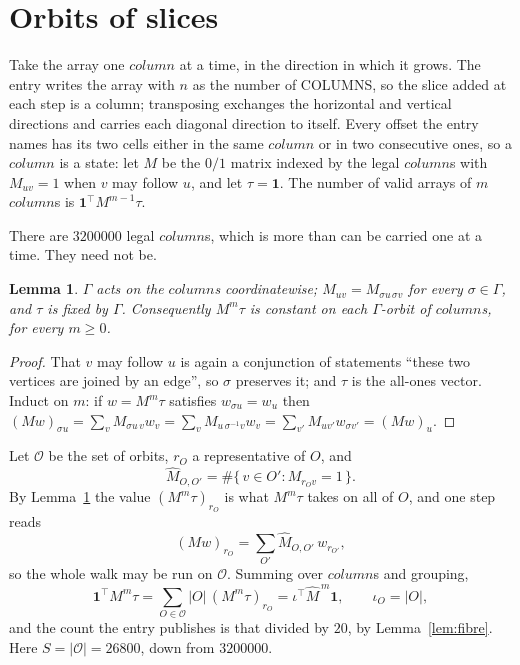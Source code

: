 \documentclass[11pt,a4paper]{article}
\theoremstyle{plain}
\newtheorem{lemma}[theorem]{Lemma}
\theoremstyle{definition}
\begin{document}
\section{Orbits of slices}

Take the array one $column$ at a time, in the direction in which it grows. The entry writes the array with $n$ as the number of COLUMNS, so the slice added at each step is a column; transposing exchanges the horizontal and vertical directions and carries each diagonal direction to itself.
Every offset the entry names has its two cells either in the same $column$ or in two
consecutive ones, so a $column$ is a state: let $M$ be the $0/1$ matrix indexed by the
legal $column$s with $M_{uv}=1$ when $v$ may follow $u$, and let $\tau=\mathbf{1}$.
The number of valid arrays of $m$ $column$s is $\mathbf{1}^{\!\top}M^{m-1}\tau$.

There are $3200000$ legal $column$s, which is more than can be carried one at a time. They
need not be.

\begin{lemma}\label{lem:lump}
$\Gamma$ acts on the $column$s coordinatewise; $M_{uv}=M_{\sigma u\,\sigma v}$ for
every $\sigma\in\Gamma$, and $\tau$ is fixed by $\Gamma$. Consequently $M^{m}\tau$ is constant
on each $\Gamma$-orbit of $column$s, for every $m\ge0$.
\end{lemma}

\begin{proof}
That $v$ may follow $u$ is again a conjunction of statements ``these two vertices are joined by
an edge'', so $\sigma$ preserves it; and $\tau$ is the all-ones vector. Induct on $m$: if
$w=M^{m}\tau$ satisfies $w_{\sigma u}=w_u$ then
$(Mw)_{\sigma u}=\sum_v M_{\sigma u\,v}w_v=\sum_v M_{u\,\sigma^{-1}v}w_v
=\sum_{v'}M_{uv'}w_{\sigma v'}=(Mw)_u$.
\end{proof}

Let $\mathcal{O}$ be the set of orbits, $r_O$ a representative of $O$, and
\[
\widehat{M}_{O,O'}=\#\{\,v\in O' : M_{r_O v}=1\,\} .
\]
By Lemma~\ref{lem:lump} the value $(M^{m}\tau)_{r_O}$ is what $M^m\tau$ takes on all of
$O$, and one step reads
\[
(M w)_{r_O}=\sum_{O'}\widehat{M}_{O,O'}\,w_{r_{O'}} ,
\]
so the whole walk may be run on $\mathcal{O}$. Summing over $column$s and grouping,
\[
\mathbf{1}^{\!\top}M^{m}\tau=\sum_{O\in\mathcal{O}}|O|\,(M^{m}\tau)_{r_O}
=\iota^{\!\top}\widehat{M}^{\,m}\mathbf{1},\qquad \iota_O=|O| ,
\]
and the count the entry publishes is that divided by $20$, by Lemma~\ref{lem:fibre}. Here $S=|\mathcal{O}|=26800$, down from $3200000$.
\end{document}
